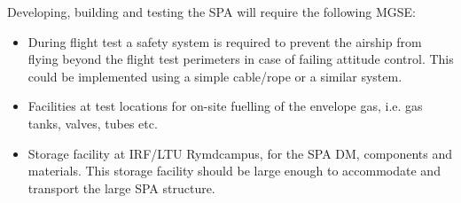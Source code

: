 Developing, building and testing the \ac{SPA} will require the following \ac{MGSE}:

\begin{itemize}
\item During flight test a safety system is required to prevent the airship from flying beyond the flight test perimeters in case of failing attitude control. This could be implemented using a simple cable/rope or a similar system.
\item Facilities at test locations for on-site fuelling of the envelope gas, i.e. gas tanks, valves, tubes etc.
\item Storage facility at \ac{IRF}/\ac{LTU} Rymdcampus, for the \ac{SPA} \ac{DM}, components and materials. This storage facility should be large enough to accommodate and transport the large \ac{SPA} structure.
\end{itemize}